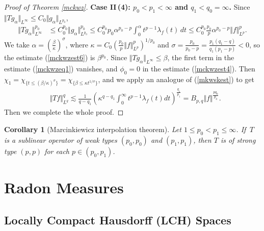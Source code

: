 \documentclass{article}
\numberwithin{equation}{section}
\theoremstyle{plain}
\newtheorem{corollary}[theorem]{Corollary}
\theoremstyle{definition}
\begin{document}
\begin{proof}[Proof of Theorem \ref{mckwz}]
\item\textbf{Case II\,(4): $p_0<p_1<\infty$ and $q_1<q_0=\infty$.} Since $\Vert Tg_\alpha\Vert_{L^\infty}\leq C_0\Vert g_\alpha\Vert_{L^{p_0}}$, 
\begin{align}
\Vert Tg_\alpha\Vert_{L^\infty}^{p_0}&\leq C_0^{p_0}\Vert g_\alpha\Vert_{L^{p_0}}^{p_0}\leq C_0^{p_0}p_0\alpha^{p_0-p}\int_0^\alpha t^{p-1}\lambda_f(t)\,dt\leq C_0^{p_0}\frac{p_0}{p}\alpha^{p_0-p}\Vert f\Vert_{L^p}^p.\label{mckwzest6}
\end{align}
We take $\alpha=(\frac{\beta}{\kappa})^\sigma$,
where $\kappa=C_0(\frac{p_0}{p}\Vert f\Vert_{L^p}^p)^{1/p_0}$ and $\sigma=\frac{p_0}{p_0-p}=\frac{p_1(q_1-q)}{q_1(p_1-p)}<0$, so the estimate (\ref{mckwzest6}) is $\beta^{p_0}$. Since $\Vert Tg_\alpha\Vert_{L^\infty}\leq\beta$, the first term in the estimate (\ref{mckwzeq1}) vanishes, and $\phi_0=0$ in the estimate (\ref{mckwzest4}). Then $\chi_1=\chi_{\{t\leq(\beta/\kappa)^{\sigma}\}}=\chi_{\{\beta\leq\kappa t^{1/\sigma}\}}$, and we apply an analogue of (\ref{mkwskest}) to get
\begin{align*}
	&\Vert Tf\Vert_{L^q}^q\lesssim\frac{1}{q-q_1}\left(\kappa^{q-q_1}\int_0^\infty t^{p-1}\lambda_f(t)dt\right)^{\frac{q_1}{p_1}}=B_{p,q}\Vert f\Vert^{\frac{pq_0}{p_0}}.
\end{align*}
Then we complete the whole proof.
\end{proof}

\begin{corollary}[Marcinkiewicz interpolation theorem]\label{mckwz2}
	Let $1\leq p_0<p_1\leq \infty$. If $\,T$ is a sublinear operator of weak types $(p_0,p_0)$ and $(p_1,p_1)$, then $T$ is of strong type $(p,p)$ for each $p\in(p_0,p_1)$.
\end{corollary}

\section{Radon Measures}
\subsection{Locally Compact Hausdorff (LCH) Spaces}
\end{document}
